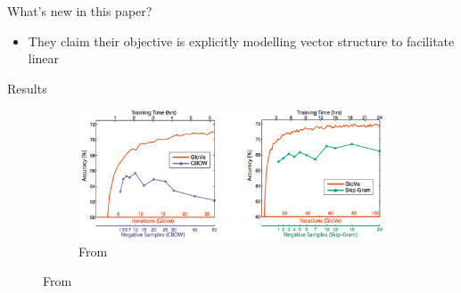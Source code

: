 \begin{frame}{What's new in this paper?}
  \begin{itemize}
  \item They claim their objective is explicitly modelling vector structure to facilitate linear 
  \end{itemize}
\end{frame}

\begin{frame}{Results}
  \begin{figure}
    \begin{figure}
      \includegraphics[scale=0.27]{images/gloveVSword2vec.png}
      \caption{From}
    \end{figure}
  \end{figure}
\end{frame}

